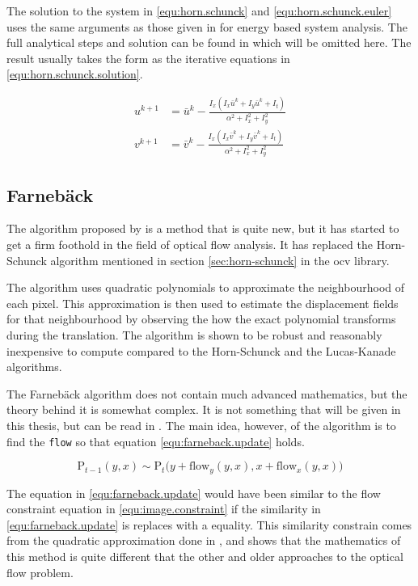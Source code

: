 The solution to the system in \eqref{equ:horn.schunck} and \eqref{equ:horn.schunck.euler} uses the same arguments as those given in \citet{khalil01} for energy based system analysis.
The full analytical steps and solution can be found in \citet{horn80} which will be omitted here. The result usually takes the form as the iterative equations in \eqref{equ:horn.schunck.solution}.

\begin{equation}\label{equ:horn.schunck.solution}
	\begin{split}
		u^{k + 1} &= \bar{u}^k - \frac{I_x\left(I_x\bar{u}^k + I_y\bar{u}^k + I_t\right)}{\alpha^2 + I_x^2 + I_y^2} \\
		v^{k + 1} &= \bar{v}^k - \frac{I_x\left(I_x\bar{v}^k + I_y\bar{v}^k + I_t\right)}{\alpha^2 + I_x^2 + I_y^2}
	\end{split}
\end{equation}

\subsection{Farnebäck}\label{sec:farneback}
The algorithm proposed by \citet{farnebackSCIA03} is a method that is quite new, but it has started to get a 
firm foothold in the field of optical flow analysis. It has replaced the Horn-Schunck algorithm mentioned in section \ref{sec:horn-schunck} in the \gls{ocv} library.

The algorithm uses quadratic polynomials to approximate the neighbourhood of each pixel. This approximation is then used to estimate the 
displacement fields for that neighbourhood by observing the how the exact polynomial transforms during the translation. The algorithm is shown 
to be robust and reasonably inexpensive to compute compared to the Horn-Schunck and the Lucas-Kanade algorithms. 

The Farnebäck algorithm does not contain much advanced mathematics, but the theory behind it is somewhat complex. It is 
not something that will be given in this thesis, but can be read in \citet{farnebackSCIA03}. The main idea, however,
of the algorithm is to find the \verb|flow| so that equation \eqref{equ:farneback.update} holds.

\begin{equation}\label{equ:farneback.update}
	\text{P}_{t-1}(y,x) \sim \text{P}_t\big(y + \text{flow}_y(y,x),x+\text{flow}_x(y,x)\big)
\end{equation}

The equation in \eqref{equ:farneback.update} would have been similar to the flow constraint equation in \eqref{equ:image.constraint} if the 
similarity in \eqref{equ:farneback.update} is replaces with a equality. This similarity constrain comes from the  quadratic 
approximation done in \citet{farnebackSCIA03}, and shows that the mathematics of this method is quite 
different that the other and older approaches to the optical flow problem.


